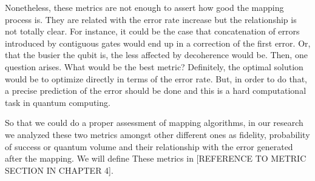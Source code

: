 Nonetheless, these metrics are not enough to assert how good the mapping process is.
They are related with the error rate increase but the relationship is not totally clear.
For instance, it could be the case that concatenation of errors introduced by contiguous gates would end up in a correction of the first error.
Or, that the busier the qubit is, the less affected by decoherence would be.
Then, one question arises.
What would be the best metric?
Definitely, the optimal solution would be to optimize directly in terms of the error rate.
But, in order to do that, a precise prediction of the error should be done and this is a hard computational task in quantum computing.

So that we could do a proper assessment of mapping algorithms, in our research we analyzed these two metrics amongst other different ones as fidelity, probability of success or quantum volume and their relationship with the error generated after the mapping.
We will define These metrics in [REFERENCE TO METRIC SECTION IN CHAPTER 4].
